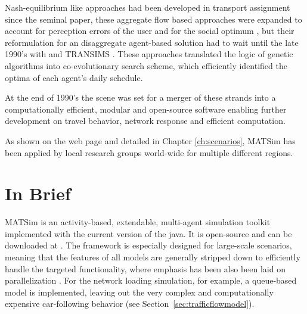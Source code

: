 
Nash-equilibrium like approaches had been developed in transport assignment since the seminal \citet[][]{Wardrop_PICE_1952} paper, these aggregate flow based approaches were expanded to account for perception errors of the user and for the social optimum \citep[see][]{DaganzoSheffi_TransScience_1977}, but their reformulation for an disaggregate agent-based solution had to wait until the late 1990’s with \citet[][]{Gawron_IJMPC_1998} and TRANSIMS \citep[][]{SmithEtAl_NTRPAC_1995}. These approaches translated the logic of genetic algorithms into co-evolutionary search scheme, which efficiently identified the optima of each agent’s daily schedule.

At the end of 1990’s the scene was set for a merger of these strands into a computationally efficient, modular and open-source software enabling further development on travel behavior, network response and efficient computation. 

As shown on the web page \citep[][]{MATSIM-T-Scenarios_Webpage_2015} and detailed in Chapter \ref{ch:scenarios}, MATSim has been applied by local research groups world-wide for multiple different regions. 

\section{In Brief}
\label{sec:inbrief}
MATSim is an activity-based, extendable, multi-agent simulation toolkit  implemented with the current version of the \gls{java}. It is open-source and can be downloaded at \citep[][]{MATSIM-T_Webpage_2015, SourceForge_Webpage_2015}. The framework is especially designed for large-scale scenarios, meaning that the features of all models are generally stripped down to efficiently handle the targeted functionality, where emphasis has been also been laid on parallelization \citep[e.g.,][]{Dobler_TechRep_IVT_2011, Charypar_PhDThesis_2008}. For the network loading simulation, for example, a queue-based model is implemented, leaving out the very complex and computationally expensive car-following behavior (see Section~\ref{sec:trafficflowmodel}).


